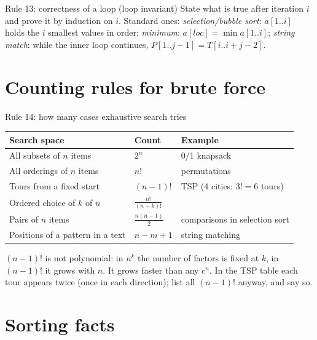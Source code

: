 \documentclass{fkt-notes}
\begin{document}
\begin{rulebox}{Rule 13: correctness of a loop (loop invariant)}
State what is true after iteration $i$ and prove it by induction on $i$. Standard ones: \emph{selection/bubble sort}: $a[1..i]$ holds the $i$ smallest values in order; \emph{minimum}: $a[\mathit{loc}]=\min a[1..i]$; \emph{string match}: while the inner loop continues, $P[1..j-1]=T[i..i+j-2]$.
\end{rulebox}

\section{Counting rules for brute force}
\label{sec:counting}

\begin{rulebox}{Rule 14: how many cases exhaustive search tries}
\centering
\begin{tabular}{@{}lll@{}}
\toprule
Search space & Count & Example \\
\midrule
All subsets of $n$ items & $2^n$ & 0/1 knapsack \\
All orderings of $n$ items & $n!$ & permutations \\
Tours from a fixed start & $(n-1)!$ & TSP (4 cities: $3!=6$ tours) \\
Ordered choice of $k$ of $n$ & $\frac{n!}{(n-k)!}$ & \\
Pairs of $n$ items & $\frac{n(n-1)}2$ & comparisons in selection sort \\
Positions of a pattern in a text & $n-m+1$ & string matching \\
\bottomrule
\end{tabular}
\end{rulebox}

\noindent $(n-1)!$ is not polynomial: in $n^k$ the number of factors is fixed at $k$, in $(n-1)!$ it grows with $n$. It grows faster than any $c^n$. In the TSP table each tour appears twice (once in each direction); list all $(n-1)!$ anyway, and say so.

\section{Sorting facts}
\label{sec:sorting}
\end{document}
